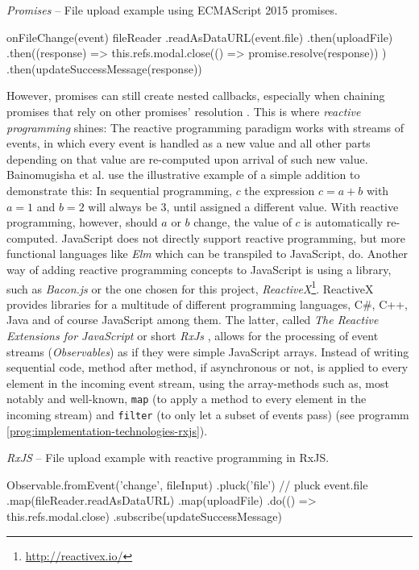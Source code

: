 \begin{program}
\caption{\emph{Promises} -- File upload example using ECMAScript 2015 promises.}
\label{prog:implementation-technologies-rxjs-promises}
\begin{JsCode}
onFileChange(event) {
  fileReader
    .readAsDataURL(event.file)
    .then(uploadFile)
    .then((response) => {
      this.refs.modal.close(() => promise.resolve(response))
    })
    .then(updateSuccessMessage(response))
}
\end{JsCode}
\end{program}

\noindent However, promises can still create nested callbacks, especially when chaining promises that rely on other promises' resolution \cite{reactive-vs-promises}. This is where \emph{reactive programming} shines: The reactive programming paradigm works with streams of events, in which every event is handled as a new value and all other parts depending on that value are re-computed upon arrival of such new value. Bainomugisha et al.  \cite{reactive-programming-survey} use the illustrative example of a simple addition to demonstrate this: In sequential programming, $c$ the expression $c = a + b$ with $a = 1$ and $b = 2$ will always be $3$, until assigned a different value. With reactive programming, however, should $a$ or $b$ change, the value of $c$ is automatically re-computed.
JavaScript does not directly support reactive programming, but more functional languages like \emph{Elm} \cite{elm} which can be transpiled to JavaScript, do. Another way of adding reactive programming concepts to JavaScript is using a library, such as \emph{Bacon.js} \cite{baconjs} or the one chosen for this project, \emph{ReactiveX}\footnote{\url{http://reactivex.io/}}. ReactiveX provides libraries for a multitude of different programming languages, C\#, C++, Java and of course JavaScript among them. The latter, called \emph{The Reactive Extensions for JavaScript} or short \emph{RxJs} \cite{rxjs}, allows for the processing of event streams (\emph{Observables}) as if they were simple JavaScript arrays. Instead of writing sequential code, method after method, if asynchronous or not, is applied to every element in the incoming event stream, using the array-methods such as, most notably and well-known, \texttt{map} (to apply a method to every element in the incoming stream) and \texttt{filter} (to only let a subset of events pass) (see programm \ref{prog:implementation-technologies-rxjs}).

\begin{program}
\caption{\emph{RxJS} -- File upload example with reactive programming in RxJS.}
\label{prog:implementation-technologies-rxjs}
\begin{JsCode}
Observable.fromEvent('change', fileInput)
  .pluck('file') // pluck event.file
  .map(fileReader.readAsDataURL)
  .map(uploadFile)
  .do(() => this.refs.modal.close)
  .subscribe(updateSuccessMessage)
\end{JsCode}
\end{program}

